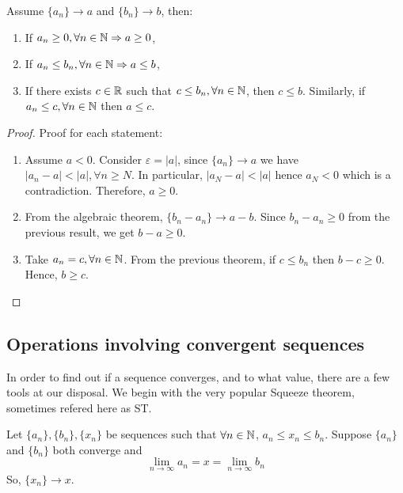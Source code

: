 \begin{theorem}
    Assume $\{a_n\} \to a$ and $\{ b_n\} \to b$, then:
    \begin{enumerate}
        \item If $a_n \geq 0, \forall n \in \mathbb{N} \Rightarrow a \geq 0$,
        \item If $a_n \leq b_n, \forall n \in \mathbb{N} \Rightarrow a \leq b$,
        \item If there exists $c \in \mathbb{R}$ such that $c \leq b_n, \forall n \in \mathbb{N}$, then $c \leq b$. Similarly, if $a_n \leq c, \forall n \in \mathbb{N}$ then $a \leq c$.
    \end{enumerate}
\end{theorem}

\begin{proof}
    Proof for each statement:
    \begin{enumerate}
        \item Assume $a < 0$. Consider $\varepsilon  = |a|$, since $\{ a_n\} \to a$ we have $|a_n - a|< |a|, \forall n \geq N$. In particular, $|a_N - a|<|a|$ hence $a_N < 0$ which is a contradiction. Therefore, $a \geq 0$.
        \item From the algebraic theorem,  $\{ b_n - a_n\} \to a-b$. Since $b_n-a_n \geq 0$ from the previous result, we get $b - a \geq 0$.
        \item Take $a_n = c, \forall n \in \mathbb{N}$. From the previous theorem, if $c \leq b_n$ then $b-c \geq 0$. Hence, $b \geq c$.
    \end{enumerate}
\end{proof}

\subsection{Operations involving convergent sequences}

In order to find out if a sequence converges, and to what value, there are a few tools at our disposal. We begin with the very popular Squeeze theorem, sometimes refered here as ST.

\begin{theorem}
    Let $\{a_n\}, \{b_n\}, \{x_n\}$ be sequences such that $\forall n \in \mathbb{N}$, $a_n \leq x_n \leq b_n$. Suppose $\{a_n\}$ and $\{b_n\}$ both converge and
    \begin{equation*}
        \lim \limits_{n \to \infty} a_n = x = \lim \limits_{n \to \infty} b_n
    \end{equation*}
    So, $\{x_n\} \to x$.
\end{theorem}

